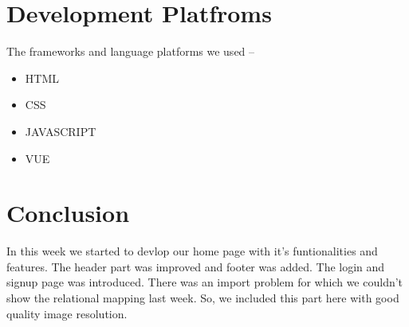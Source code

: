 \documentclass[a4paper,12pt]{report}
\begin{document}
\section*{Development Platfroms}
The frameworks and language platforms we used --
\begin{itemize}
	\item HTML
	\item CSS
	\item JAVASCRIPT
	\item VUE
\end{itemize}

\section*{Conclusion}
In this week we started to devlop our home page with it's funtionalities and features. The header part was improved and footer was added. The login and signup page was introduced. There was an import problem for which we couldn't show the relational mapping last week. So, we included this part here with good quality image resolution.
\end{document}
